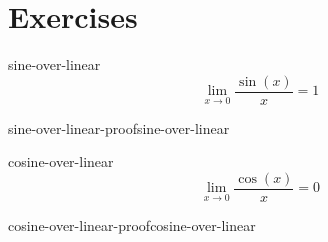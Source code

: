 \documentclass[preview]{standalone}
\begin{document}
\genpage

\section{Exercises}



\begin{snippetproposition}{sine-over-linear}{}
    \[
        \lim_{x \to 0} \frac{\sin(x)}{x} = 1
    \]
\end{snippetproposition}

\begin{snippetproof}{sine-over-linear-proof}{sine-over-linear}{}
    \todo
\end{snippetproof}

\begin{snippetproposition}{cosine-over-linear}{}
    \[
        \lim_{x \to 0} \frac{\cos(x)}{x} = 0
    \]
\end{snippetproposition}

\begin{snippetproof}{cosine-over-linear-proof}{cosine-over-linear}{}
    \todo
\end{snippetproof}
\end{document}
